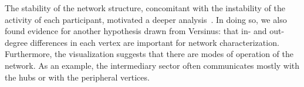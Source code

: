 																																																																																																																																																																																																																																																																																																																																																																																																															The stability of the network structure, concomitant with the instability of the activity of each participant,
																																																																																																																																																																																																																																																																																																																																																																																																															motivated a deeper analysis~\cite{stab}.
																																																																																																																																																																																																																																																																																																																																																																																																															In doing so, we also found evidence for another hypothesis drawn from Versinus:
																																																																																																																																																																																																																																																																																																																																																																																																															that in- and out-degree differences in each vertex are important for network characterization.
																																																																																																																																																																																																																																																																																																																																																																																																															Furthermore, the visualization suggests that there are modes of operation of the network.
																																																																																																																																																																																																																																																																																																																																																																																																															As an example, the intermediary sector often communicates mostly with the hubs or with the peripheral vertices.
